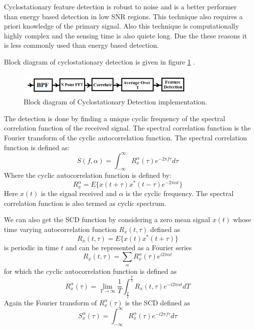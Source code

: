 Cyclostationary feature detection is robust to noise and is a better performer 
than energy based detection in low SNR regions. This technique also requires a 
priori knowledge of the primary signal. Also this technique is computationally 
highly complex and the sensing time is also quiete long. Due the these reasons 
it is less commonly used than energy based detection.

Block diagram of cyclostationary detection is given in figure \ref{csd}
\cite{mansi11}.


\begin{figure}[h]
\centering
\includegraphics[width=0.8\textwidth]{../images/csd}
\caption[Cyclostationary Detection implementation]{Block diagram 
of Cyclostationary Detection implementation.}
\label{csd}
\end{figure}
 

The detection is done by finding a unique cyclic frequency of the spectral 
correlation function of the received signal\cite{cabric04}. The spectral correlation 
function is the Fourier transform of the cyclic autocorrelation function. The 
spectral correlation function is defined as:
\begin{equation*}
        S(f,\alpha) = \int_{-\infty}^{\infty} R_{x}^{\alpha}(\tau)e^{-2 \pi f\tau}d\tau 
\end{equation*}
Where the cyclic autocorrelation function is defined by:
\begin{equation*}
    R_{x}^{\alpha} = E\{x(t+\tau)x^{*}(t-\tau)e^{-2 \pi \alpha t}\}
\end{equation*}
Here $x(t)$ is the signal received and $\alpha$ is the cyclic frequency. The spectral 
correlation function is also termed as cyclic spectrum.

We can also get the SCD function by considering a zero mean signal $x(t)$
whose time varying autocorrelation function $R_x(t,\tau)$ defined as
\cite{prithvi11}
\begin{equation*}
    R_{x}(t,\tau) = E\{x(t)x^{\ast}(t+\tau)\}
\end{equation*}
is periodic in time $t$ and can be represented as a Fourier series
\begin{equation*}
    R_{x}(t,\tau) = \sum_{\alpha}R_{x}^{\alpha} (\tau)e^{i2\pi\alpha t} 
\end{equation*}
for which the cyclic autocorrelation function is defined as
\begin{equation*}
    R_{x}^{\alpha}(\tau) = \lim_{T\rightarrow\infty} {\frac{1}{T}}
    \int_{\frac{T}{2}}^{\frac{T}{2}}R_{x}(t,\tau)e^{-i2\pi\alpha t}dT
\end{equation*}
Again the Fourier transform of $R_{x}^{\alpha}(\tau)$ is the SCD defined as
\begin{equation*}
    S_{x}^{\alpha}(\tau)=\int_{-\infty}^{\infty}R_{x}^{\alpha}
    (\tau)e^{-i2\pi f\tau}d\tau
\end{equation*}

